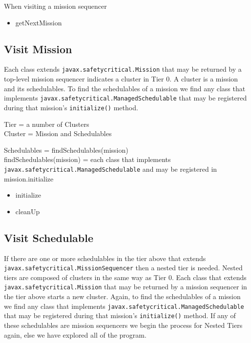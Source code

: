 \documentclass[10pt,a4paper]{article}
\newenvironment{ttSection}{\ttfamily}{\par}
\begin{document}
When visiting a mission sequencer


\begin{itemize}
\item getNextMission
\end{itemize}

\subsection{Visit Mission}

Each class extends \texttt{javax.safetycritical.Mission} that may be returned by a top-level mission sequencer indicates a cluster in Tier 0. A cluster is a mission and its schedulables. To find the schedulables of a mission we find any class that implements \texttt{javax.safetycritical.ManagedSchedulable} that may be registered during that mission's \texttt{initialize()} method. 

\begin{ttSection}
Tier = a number of Clusters\\

Cluster = Mission and Schedulables
\end{ttSection}

\begin{ttSection}
Schedulables = findSchedulables(mission)\\

findSchedulables(mission) = each class that implements \texttt{javax.safetycritical.ManagedSchedulable} and may be registered in mission.initialize
\end{ttSection}

\begin{itemize}
\item initialize
\item cleanUp
\end{itemize}

\subsection{Visit Schedulable}
\label{sec:schedulables}

If there are one or more schedulables in the tier above that extends \texttt{javax.safetycritical.MissionSequencer} then a nested tier is needed. Nested tiers are composed of clusters in the same way as Tier 0. Each class that extends \texttt{javax.safetycritical.Mission} that may be returned by a mission sequencer in the tier above starts a new cluster. Again, to find the schedulables of a mission we find any class that implements \texttt{javax.safetycritical.ManagedSchedulable} that may be registered during that mission's \texttt{initialize()} method. If any of these schedulables are mission sequencers we begin the process for Nested Tiers again, else we have explored all of the program.
\end{document}
